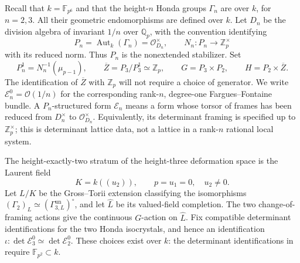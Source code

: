 \documentclass[11pt]{article}
\numberwithin{equation}{section}
\theoremstyle{definition}
\theoremstyle{remark}
\begin{document}
Recall that $k=\mathbb F_{p^6}$ and that the height-$n$ Honda groups $\Gamma_n$ are over $k$,
for $n=2,3$.  All their geometric endomorphisms are defined over $k$.
Let $D_n$ be the division algebra of invariant $1/n$ over $\mathbb Q_p$, with
the convention identifying
\[
 P_n=\operatorname{Aut}_k(\Gamma_n)=\mathcal O_{D_n}^{\times},\qquad
 N_n:P_n\longrightarrow\mathbb Z_p^{\times}
\]
with its reduced norm.  Thus $P_n$ is the nonextended stabilizer.  Set
\[
 P_n^1=N_n^{-1}(\mu_{p-1}),\qquad
 \overline Z=P_3/P_3^1\simeq\mathbb Z_p,\qquad
 G=P_3\times P_2,\qquad H=P_2\times\overline Z.
\]
The identification of $\overline Z$ with $\mathbb Z_p$ will not require a choice
of generator.  We write $\mathcal E_n^0=\mathcal O(1/n)$ for the corresponding
rank-$n$, degree-one Fargues--Fontaine bundle.  A $P_n$-structured form
$\mathcal E_n$ means a form whose torsor of frames has been reduced from
$D_n^{\times}$ to $\mathcal O_{D_n}^{\times}$.  Equivalently, its determinant
framing is specified up to $\mathbb Z_p^{\times}$; this is determinant lattice
data, not a lattice in a rank-$n$ rational local system.

The height-exactly-two stratum of the height-three deformation space is
the Laurent field
\[
 K=k((u_2)),\qquad p=u_1=0,\quad u_2\ne0.
\]
Let $L/K$ be the Gross--Torii extension classifying the isomorphisms
$(\Gamma_2)_L\simeq(\Gamma^{\mathrm{un}}_{3,L})^{\circ}$, and let
$\widehat L$ be its valued-field completion.  The two change-of-framing
actions give the continuous $G$-action on $\widehat L$.  Fix compatible
determinant identifications for the two Honda isocrystals, and hence an
identification
$\iota:\det\mathcal E_3^0\simeq\det\mathcal E_2^0$.
These choices exist over $k$: the determinant identifications in
\cite[\S2.7]{BMR2026} require $\mathbb F_{p^2}\subset k$.
\end{document}
